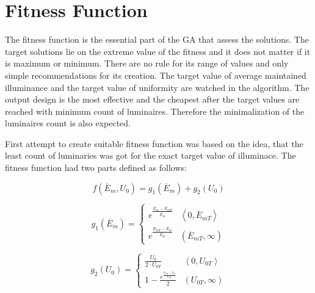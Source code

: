 \section{Fitness Function}
The fitness function is the essential part of the GA that assess the solutions. The target solutions lie on the extreme value of the fitness and it does not matter if it is maximum or minimum. There are no rule for its range of values and only simple recommendations for its creation. The target value of average maintained illuminance and the target value of uniformity are watched in the algorithm. The output design is the most effective and the cheapest after the target values are reached with minimum count of luminaires. Therefore the minimalization of the luminaires count is also expected.

First attempt to create suitable fitness function was based on the idea, that the least count of luminaries was got for the exact target value of illuminace. The fitness function had two parts defined as follows:

\begin{equation}
\label{eq:fitV1}
f\left(\overline{E}_{m}, U_0\right) = g_1\left(\overline{E}_{m}\right) + g_2\left(U_0\right)
\end{equation}

\begin{equation}
\label{eq:fitV1G1}
	g_1\left(\overline{E}_{m}\right)=
	\begin{cases} 
		e^{\frac{\overline{E}_{m}-\overline{E}_{mT}}{\overline{E}_{m}}} & \left\langle 0, \overline{E}_{mT}\right\rangle\\
		e^{\frac{\overline{E}_{mT}-\overline{E}_{m}}{\overline{E}_{m}}} & \left( \overline{E}_{mT}, \infty\right)
	\end{cases}
\end{equation}

\begin{equation}
	g_2\left(U_0\right)=
	\begin{cases} 
		\frac{U_0}{2\cdot U_{0T}} & \left\langle 0, U_{0T}\right\rangle\\
		1-\frac{e^{\frac{U_{0T}-U_0}{U_{0T}}}}{2} & \left( U_{0T}, \infty\right)
	\end{cases}
\end{equation}